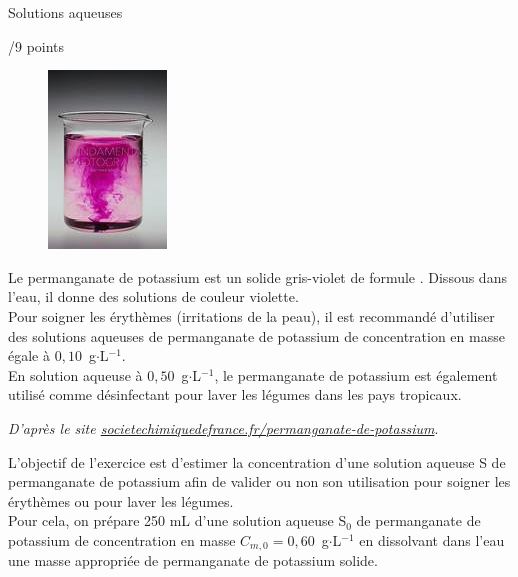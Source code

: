 \newpage
\setcounter{exercice}{0}
\begin{doc}{Solutions aqueuses \begin{Large}
    /9 points
\end{Large}}
\begin{figure}
\vspace{-1cm}
    \centering
      \includegraphics[scale=1.0]{Images/DS/Devoir_Commun/Permanganate.png}
  \end{figure}
\og Le permanganate de potassium est un solide gris-violet de formule . Dissous dans l’eau, il donne des solutions de couleur violette.\\
Pour soigner les érythèmes (irritations de la peau), il est recommandé d’utiliser des solutions aqueuses de permanganate de potassium de concentration en masse égale à $0,10$~g$\cdot$L$^{-1}$.\\
En solution aqueuse à $0,50$~g$\cdot$L$^{-1}$, le permanganate de potassium est également utilisé comme désinfectant pour laver les légumes dans les pays tropicaux.\fg
\begin{flushright}
    \textit{D’après le site \url{ societechimiquedefrance.fr/permanganate-de-potassium}}.
\end{flushright}

L’objectif de l’exercice est d’estimer la concentration d’une solution aqueuse S de permanganate de potassium afin de valider ou non son utilisation pour soigner les érythèmes ou pour laver les légumes.\\

Pour cela, on prépare 250 mL d’une solution aqueuse S$_0$ de permanganate de potassium de concentration en masse $C_{m,0} = 0,60$~g$\cdot$L$^{-1}$ en dissolvant dans l’eau une masse appropriée de permanganate de potassium solide.\\




\end{doc}
